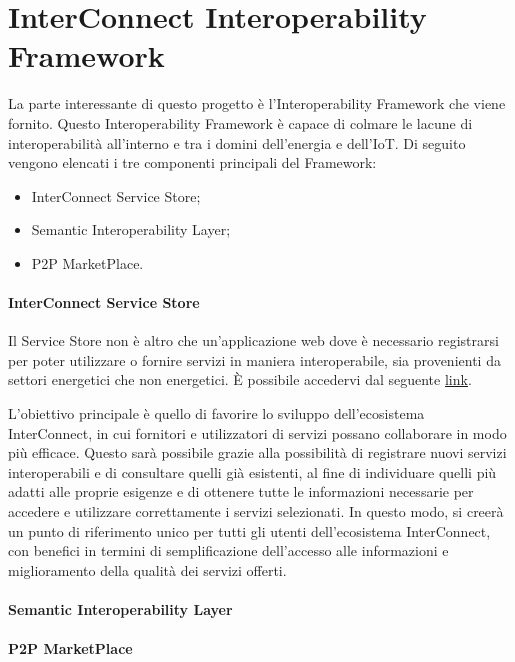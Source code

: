 \section{InterConnect Interoperability Framework}
La parte interessante di questo progetto è l'Interoperability Framework che viene fornito.
Questo Interoperability Framework è capace di colmare le lacune di interoperabilità all'interno e tra i domini dell'energia e dell'IoT.
Di seguito vengono elencati i tre componenti principali del Framework:
\begin{itemize}
    \item InterConnect Service Store;
    \item Semantic Interoperability Layer;
    \item P2P MarketPlace.
\end{itemize}

\paragraph{InterConnect Service Store}

Il Service Store non è altro che un'applicazione web dove è necessario registrarsi per poter utilizzare o fornire servizi in maniera interoperabile, sia provenienti da settori energetici che non energetici. È possibile accedervi dal seguente \href{https://store.interconnectproject.eu/ServiceStore}{link}.

L'obiettivo principale è quello di favorire lo sviluppo dell'ecosistema InterConnect, in cui fornitori e utilizzatori di servizi possano collaborare in modo più efficace. Questo sarà possibile grazie alla possibilità di registrare nuovi servizi interoperabili e di consultare quelli già esistenti, al fine di individuare quelli più adatti alle proprie esigenze e di ottenere tutte le informazioni necessarie per accedere e utilizzare correttamente i servizi selezionati. In questo modo, si creerà un punto di riferimento unico per tutti gli utenti dell'ecosistema InterConnect, con benefici in termini di semplificazione dell'accesso alle informazioni e miglioramento della qualità dei servizi offerti.


\paragraph{Semantic Interoperability Layer}

\paragraph{P2P MarketPlace}
